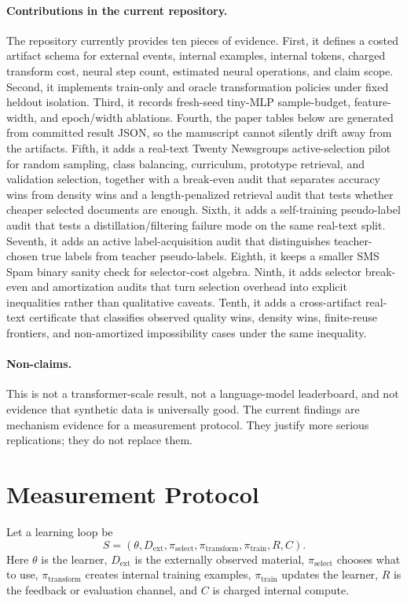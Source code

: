 \documentclass[11pt]{article}
\begin{document}
\paragraph{Contributions in the current repository.}
The repository currently provides ten pieces of evidence. First, it defines a
costed artifact schema for external events, internal examples, internal tokens,
charged transform cost, neural step count, estimated neural operations, and
claim scope. Second, it implements train-only and oracle transformation
policies under fixed heldout isolation. Third, it records fresh-seed tiny-MLP
sample-budget, feature-width, and epoch/width ablations. Fourth, the paper
tables below are generated from committed result JSON, so the manuscript cannot
silently drift away from the artifacts. Fifth, it adds a real-text Twenty
Newsgroups active-selection pilot for random sampling, class balancing,
curriculum, prototype retrieval, and validation selection, together with a
break-even audit that separates accuracy wins from density wins and a
length-penalized retrieval audit that tests whether cheaper selected documents
are enough. Sixth, it adds a self-training pseudo-label audit that tests a
distillation/filtering failure mode on the same real-text split. Seventh, it
adds an active label-acquisition audit that distinguishes teacher-chosen true
labels from teacher pseudo-labels. Eighth, it keeps a smaller SMS Spam binary
sanity check for selector-cost algebra. Ninth, it adds selector break-even and
amortization audits that turn selection overhead
into explicit inequalities rather than qualitative caveats. Tenth, it adds a
cross-artifact real-text certificate that classifies observed quality wins,
density wins, finite-reuse frontiers, and non-amortized impossibility cases
under the same inequality.

\paragraph{Non-claims.}
This is not a transformer-scale result, not a language-model leaderboard, and
not evidence that synthetic data is universally good. The current findings are
mechanism evidence for a measurement protocol. They justify more serious
replications; they do not replace them.

\section{Measurement Protocol}

Let a learning loop be
\[
S = (\theta, D_{\mathrm{ext}}, \pi_{\mathrm{select}},
\pi_{\mathrm{transform}}, \pi_{\mathrm{train}}, R, C).
\]
Here $\theta$ is the learner, $D_{\mathrm{ext}}$ is the externally observed
material, $\pi_{\mathrm{select}}$ chooses what to use, $\pi_{\mathrm{transform}}$
creates internal training examples, $\pi_{\mathrm{train}}$ updates the learner,
$R$ is the feedback or evaluation channel, and $C$ is charged internal compute.
\end{document}
